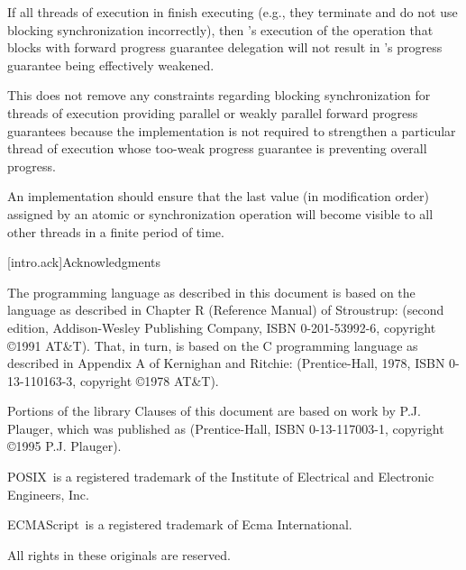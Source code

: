 \pnum
\begin{note}
If all threads of execution in  finish executing (e.g., they terminate
and do not use blocking synchronization incorrectly), then 's execution
of the operation that blocks with forward progress guarantee delegation will not
result in 's progress guarantee being effectively weakened.
\end{note}

\pnum
\begin{note}
This does not remove any constraints regarding blocking synchronization for
threads of execution providing parallel or weakly parallel forward progress
guarantees because the implementation is not required to strengthen a particular
thread of execution whose too-weak progress guarantee is preventing overall progress.
\end{note}

\pnum
An implementation should ensure that the last value (in modification order)
assigned by an atomic or synchronization operation will become visible to all
other threads in a finite period of time.%
%

[intro.ack]{Acknowledgments}

\pnum
The \Cpp  programming language as described in this document
is based on the language as described in Chapter R (Reference
Manual) of Stroustrup:  (second
edition, Addison-Wesley Publishing Company, ISBN 0-201-53992-6,
copyright \copyright 1991 AT\&T). That, in turn, is based on the C
programming language as described in Appendix A of Kernighan and
Ritchie:  (Prentice-Hall, 1978, ISBN
0-13-110163-3, copyright \copyright 1978 AT\&T).

\pnum
Portions of the library Clauses of this document are based
on work by P.J. Plauger, which was published as  (Prentice-Hall, ISBN 0-13-117003-1, copyright
\copyright 1995 P.J. Plauger).

\pnum
POSIX\textregistered\ is a registered trademark of the Institute of Electrical and
Electronic Engineers, Inc.

\pnum
ECMAScript\textregistered\ is a registered trademark of Ecma International.

\pnum
All rights in these originals are reserved.
